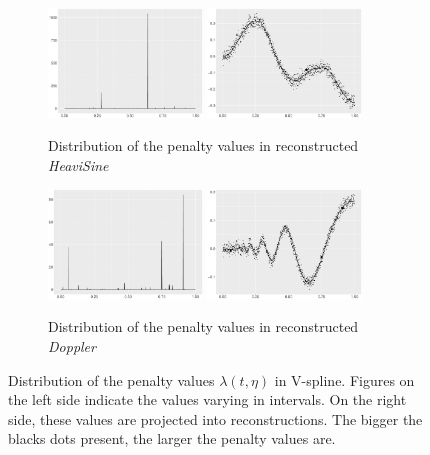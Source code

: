 \begin{figure}
\begin{subfigure}{\textwidth}
    \end{subfigure}
    \begin{subfigure}{\textwidth}
    \centering
    \includegraphics[width=0.45\textwidth]{Chapters/02TractorSplineTheory/plot/ggplot/ggHeaviSinePenaltyBar.pdf}
    \includegraphics[width=0.45\textwidth]{Chapters/02TractorSplineTheory/plot/ggplot/ggHeaviSinePenaltyLine.pdf}
    \caption{Distribution of the penalty values in reconstructed \textit{HeaviSine}}
    \end{subfigure}
    \begin{subfigure}{\textwidth}
    \centering
    \includegraphics[width=0.45\textwidth]{Chapters/02TractorSplineTheory/plot/ggplot/ggDopplerPenaltyBar.pdf}
    \includegraphics[width=0.45\textwidth]{Chapters/02TractorSplineTheory/plot/ggplot/ggDopplerPenaltyLine.pdf}
    \caption{Distribution of the penalty values in reconstructed \textit{Doppler}}
    \end{subfigure}
\caption{Distribution of the penalty values $\lambda(t,\eta)$ in V-spline. Figures on the left side indicate the values varying in intervals. On the right side, these values are projected into reconstructions. The bigger the blacks dots present, the larger the penalty values are.}\label{numpenalty}
\end{figure}


